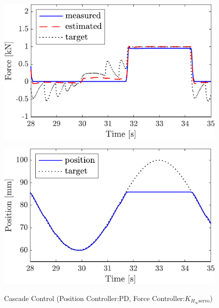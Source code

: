 \begin{figure}[t]
    \begin{minipage}{\minipageratio\hsize}
    \centering
        \includegraphics[keepaspectratio, scale = \minifigscale]{contents/IntegrationControl/figure/SECASQ/crop-FBcsqtch_JFPS4_Notrq_posPIDadjust_force.pdf}
        \label{fig5:crop-FBcsqtch_JFPS4_Notrq_posPIDadjust_force}
    \end{minipage}
    \begin{minipage}{\minipageratio\hsize}
    \centering
        \includegraphics[keepaspectratio, scale = \minifigscale]{contents/IntegrationControl/figure/SECASQ/crop-FBcsqtch_JFPS4_Notrq_posPIDadjust_pos.pdf}
        \label{fig5:crop-FBcsqtch_JFPS4_Notrq_posPIDadjust_pos}
    \end{minipage}
    \caption{Cascade Control (Position Controller:PD, Force Controller:$K_{H_\infty\mathrm{servo}}$)}  
    \label{fig5:crop-FBcsqtch_JFPS4_Notrq_posPIDadjust}
\end{figure}

